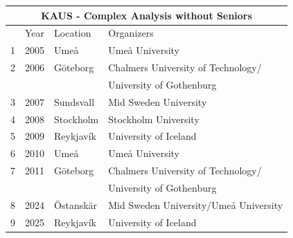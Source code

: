 \documentclass[12pt, openany, twoside]{report}      %
\begin{document}
\begin{center}
    \begin{tabular}{llll}
        \toprule
        \multicolumn{4}{c}{KAUS - Complex Analysis without Seniors}\\
        \midrule
         & Year & Location & Organizers \\
         \midrule
        1 & 2005 & Umeå & Umeå University\\
        2 & 2006 & Göteborg  & Chalmers University of Technology/\\
          &      &               & University of Gothenburg \\
        3 & 2007 & Sundsvall & Mid Sweden University\\
        4 & 2008 & Stockholm & Stockholm University  \\
        5 & 2009 & Reykjavík & University of Iceland\\
        6 & 2010 & Umeå & Umeå University\\
        7 & 2011 & Göteborg & Chalmers University of Technology/\\
           &      &               & University of Gothenburg\\
        8 & 2024 & Östanskär & Mid Sweden University/Umeå University\\
        9 & 2025 & Reykjavík & University of Iceland\\
        \bottomrule
    \end{tabular}
\end{center}
\end{document}

